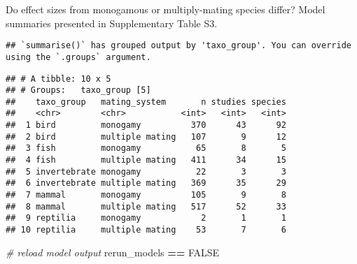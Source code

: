 \documentclass[]{article}
\newenvironment{Shaded}{\begin{snugshade}}{\end{snugshade}}
\newcommand{\KeywordTok}[1]{\textcolor[rgb]{0.13,0.29,0.53}{\textbf{#1}}}
\newcommand{\DataTypeTok}[1]{\textcolor[rgb]{0.13,0.29,0.53}{#1}}
\newcommand{\StringTok}[1]{\textcolor[rgb]{0.31,0.60,0.02}{#1}}
\newcommand{\CommentTok}[1]{\textcolor[rgb]{0.56,0.35,0.01}{\textit{#1}}}
\newcommand{\OtherTok}[1]{\textcolor[rgb]{0.56,0.35,0.01}{#1}}
\newcommand{\OperatorTok}[1]{\textcolor[rgb]{0.81,0.36,0.00}{\textbf{#1}}}
\newcommand{\NormalTok}[1]{#1}
\begin{document}
Do effect sizes from monogamous or multiply-mating species differ? Model
summaries presented in Supplementary Table S3.

\begin{Shaded}
\end{Shaded}

\begin{verbatim}
## `summarise()` has grouped output by 'taxo_group'. You can override using the `.groups` argument.
\end{verbatim}

\begin{verbatim}
## # A tibble: 10 x 5
## # Groups:   taxo_group [5]
##    taxo_group   mating_system       n studies species
##    <chr>        <chr>           <int>   <int>   <int>
##  1 bird         monogamy          370      43      92
##  2 bird         multiple mating   107       9      12
##  3 fish         monogamy           65       8       5
##  4 fish         multiple mating   411      34      15
##  5 invertebrate monogamy           22       3       3
##  6 invertebrate multiple mating   369      35      29
##  7 mammal       monogamy          105       9       8
##  8 mammal       multiple mating   517      52      33
##  9 reptilia     monogamy            2       1       1
## 10 reptilia     multiple mating    53       7       6
\end{verbatim}

\begin{Shaded}
\begin{Highlighting}[]
\CommentTok{# reload model output}
\NormalTok{rerun_models }\OperatorTok{==}\StringTok{ }\OtherTok{FALSE}
\end{Highlighting}
\end{Shaded}
\end{document}
